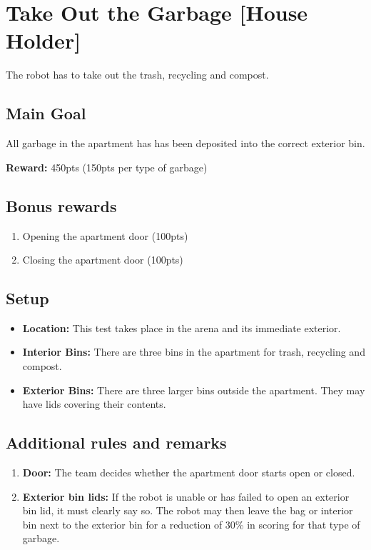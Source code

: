 \section{Take Out the Garbage [House Holder]}
The robot has to take out the trash, recycling and compost.


\subsection{Main Goal}
All garbage in the apartment has has been deposited into the correct exterior bin.

\noindent\textbf{Reward:} 450pts (150pts per type of garbage)

\subsection{Bonus rewards}
\begin{enumerate}[nosep]
	\item Opening the apartment door (100pts)
	\item Closing the apartment door (100pts)
\end{enumerate}

\subsection{Setup}
\begin{itemize}[nosep]
	\item \textbf{Location:} This test takes place in the arena and its immediate exterior.
	\item \textbf{Interior Bins:} There are three bins in the apartment for trash, recycling and compost.
	\item \textbf{Exterior Bins:} There are three larger bins outside the apartment. They may have lids covering their contents.
\end{itemize}


\subsection{Additional rules and remarks}
\begin{enumerate}[nosep]
	\item \textbf{Door:} The team decides whether the apartment door starts open or closed.
	\item \textbf{Exterior bin lids:} If the robot is unable or has failed to open an exterior bin lid, it must clearly say so. The robot may then leave the bag or interior bin next to the exterior bin for a reduction of 30\% in scoring for that type of garbage.

\end{enumerate}

